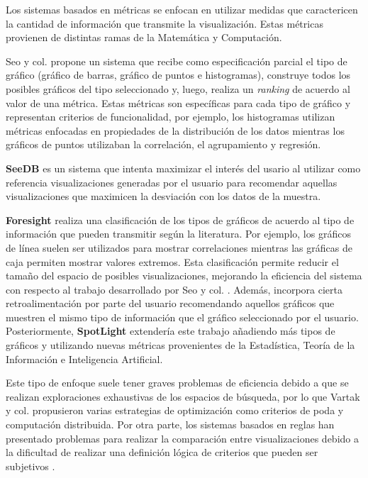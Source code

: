 Los sistemas basados en m\'etricas se enfocan en utilizar medidas que caractericen la cantidad
de informaci\'on que transmite la visualizaci\'on. Estas m\'etricas provienen de distintas ramas
de la Matem\'atica y Computaci\'on.

Seo y col. \cite{seo2004rank} propone un sistema que recibe como especificaci\'on parcial el tipo de
gr\'afico (gr\'afico de barras, gr\'afico de puntos e histogramas), construye todos los posibles
gr\'aficos del tipo seleccionado y, luego, realiza un \textit{ranking} de acuerdo al valor de una m\'etrica. Estas
m\'etricas son espec\'ificas para cada tipo de gr\'afico y representan criterios de funcionalidad, por ejemplo, los histogramas utilizan m\'etricas enfocadas en propiedades
de la distribuci\'on de los datos mientras los gr\'aficos de puntos utilizaban la correlaci\'on, el agrupamiento y regresi\'on.

\textbf{SeeDB} \cite{vartak2014seedb} es un sistema que intenta maximizar el inter\'es del usario
al utilizar como referencia visualizaciones generadas por el usuario
para recomendar aquellas visualizaciones que maximicen la desviaci\'on con los datos de la muestra.

\textbf{Foresight} \cite{demiralp2017foresight} realiza una clasificaci\'on de los tipos de gr\'aficos de
acuerdo al tipo de informaci\'on que pueden transmitir seg\'un la literatura. Por ejemplo, los gr\'aficos de l\'inea suelen ser utilizados para mostrar correlaciones
mientras las gr\'aficas de caja permiten mostrar valores extremos. Esta clasificaci\'on permite reducir el tama\~no
del espacio de posibles visualizaciones, mejorando la eficiencia del sistema con respecto al trabajo desarrollado por Seo y col. \cite{seo2004rank}.
Adem\'as, incorpora cierta retroalimentaci\'on por
parte del usuario recomendando aquellos gr\'aficos que muestren el mismo tipo de informaci\'on que el gr\'afico
seleccionado por el usuario. Posteriormente, \textbf{SpotLight} \cite{harris2021insight} extender\'ia este trabajo a\~nadiendo
m\'as tipos de gr\'aficos y utilizando nuevas m\'etricas provenientes de la Estad\'istica, Teor\'ia de la Informaci\'on e Inteligencia Artificial.

Este tipo de enfoque suele tener graves problemas de eficiencia debido a que se realizan exploraciones exhaustivas de los
espacios de b\'usqueda, por lo que Vartak y col. \cite{vartak2014seedb} propusieron varias estrategias de optimizaci\'on como criterios de poda y computaci\'on distribuida.
Por otra parte, los sistemas basados en reglas han presentado problemas para realizar la comparaci\'on entre visualizaciones debido
a la dificultad de realizar una definici\'on l\'ogica de criterios que pueden ser subjetivos \cite{vartak2017towards}.

